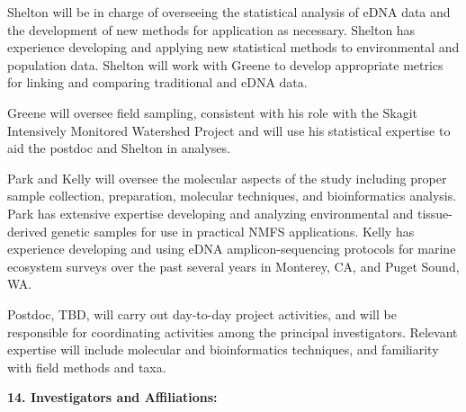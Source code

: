 \documentclass[]{article}
\begin{document}
Shelton will be in charge of overseeing the statistical analysis of eDNA
data and the development of new methods for application as necessary.
Shelton has experience developing and applying new statistical methods
to environmental and population data. Shelton will work with Greene to
develop appropriate metrics for linking and comparing traditional and
eDNA data.{~}

Greene will oversee field sampling, consistent with his role with the
Skagit Intensively Monitored Watershed Project and will use his
statistical expertise to aid the postdoc and Shelton in analyses.{~}

Park and Kelly will oversee the molecular aspects of the study including
proper sample collection, preparation, molecular techniques, and
bioinformatics analysis. Park has extensive expertise developing and
analyzing environmental and tissue-derived genetic samples for use in
practical NMFS applications. Kelly has experience developing and using
eDNA amplicon-sequencing protocols for marine ecosystem surveys over the
past several years in Monterey, CA, and Puget Sound, WA.

Postdoc, TBD, will carry out day-to-day project activities, and will be
responsible for coordinating activities among the principal
investigators. Relevant expertise will include molecular and
bioinformatics techniques, and familiarity with field methods and taxa.

\textbf{}

\textbf{14. Investigators and Affiliations:}
\end{document}
